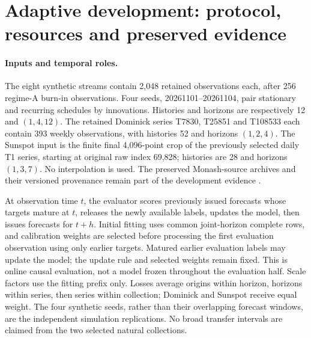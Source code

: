 \section{Adaptive development: protocol, resources and preserved evidence}
\label{app:adaptive-development}

\paragraph{Inputs and temporal roles.}
The eight synthetic streams contain 2,048 retained observations each, after
256 regime-A burn-in observations. Four seeds, 20261101--20261104, pair
stationary and recurring schedules by innovations. Histories and horizons
are respectively 12 and $(1,4,12)$. The retained Dominick series T7830,
T25851 and T108533 each contain 393 weekly observations, with histories 52
and horizons $(1,2,4)$. The Sunspot input is the finite final 4,096-point
crop of the previously selected daily T1 series, starting at original raw
index 69,828; histories are 28 and horizons $(1,3,7)$. No interpolation is
used. The preserved Monash-source archives and their versioned provenance
remain part of the development evidence \citep{Godahewa2021Monash}.

At observation time $t$, the evaluator scores previously issued forecasts
whose targets mature at $t$, releases the newly available labels, updates
the model, then issues forecasts for $t+h$. Initial fitting uses common
joint-horizon complete rows, and calibration weights are selected before
processing the first evaluation observation using only earlier targets.
Matured earlier evaluation labels may update the model; the update rule and
selected weights remain fixed. This is online causal evaluation, not a
model frozen throughout the evaluation half. Scale factors use the fitting
prefix only. Losses average origins within horizon, horizons within series,
then series within collection; Dominick and Sunspot receive equal weight.
The four synthetic seeds, rather than their overlapping forecast windows,
are the independent simulation replications. No broad transfer intervals
are claimed from the two selected natural collections.

